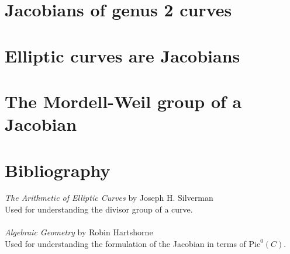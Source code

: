 \documentclass[12pt]{article}
\theoremstyle{definition}
\begin{document}
\section{Jacobians of genus 2 curves}


\section{Elliptic curves are Jacobians}

\section{The Mordell-Weil group of a Jacobian}

\section{Bibliography}
\textit{The Arithmetic of Elliptic Curves} by Joseph H. Silverman
\\
Used for understanding the divisor group of a curve.
\\\\
\textit{Algebraic Geometry} by Robin Hartshorne
\\
Used for understanding the formulation of the Jacobian in terms of $\mathrm{Pic}^0(C)$.
\end{document}
